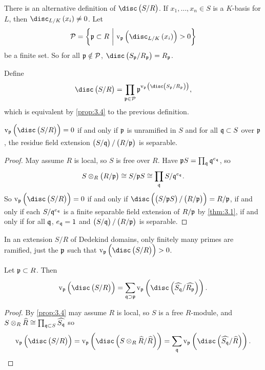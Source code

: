 There is an alternative definition of $ \disc\br{S / R} $. If $ x_1, \dots, x_n \in S $ is a $ K $-basis for $ L $, then $ \disc_{L / K} \br{x_i} \ne 0 $. Let
$$ \PPP = \cbr{\ppp \subset R \st \v_\ppp\br{\disc_{L / K} \br{x_i}} > 0} $$
be a finite set. So for all $ \mathfrak{p} \notin \mathcal{P} $, $ \disc\br{S_\ppp / R_\ppp} = R_\ppp $.

\begin{definition*}
Define
$$ \disc\br{S / R} = \prod_{\ppp \in \PPP} \ppp^{\v_\ppp\br{\disc\br{S_\ppp / R_\ppp}}}, $$
which is equivalent by \ref{prop:3.4} to the previous definition.
\end{definition*}

\begin{theorem}
\label{thm:3.5}
$ \v_\ppp\br{\disc\br{S / R}} = 0 $ if and only if $ \mathfrak{p} $ is unramified in $ S $ and for all $ \mathfrak{q} \subset S $ over $ \mathfrak{p} $, the residue field extension $ \br{S / \qqq} / \br{R / \ppp} $ is separable.
\end{theorem}

\begin{proof}
May assume $ R $ is local, so $ S $ is free over $ R $. Have $ \mathfrak{p} S = \prod_{\mathfrak{q}} \mathfrak{q}^{e_{\mathfrak{q}}} $, so
$$ S \otimes_R \br{R / \ppp} \cong S / \ppp S \cong \prod_\qqq S / \qqq^{e_\qqq}. $$
So $ \v_\ppp\br{\disc\br{S / R}} = 0 $ if and only if $ \disc\br{\br{S / \ppp S} / \br{R / \ppp}} = R / \ppp $, if and only if each $ S / \mathfrak{q}^{e_{\mathfrak{q}}} $ is a finite separable field extension of $ R / \mathfrak{p} $ by \ref{thm:3.1}, if and only if for all $ \mathfrak{q} $, $ e_{\mathfrak{q}} = 1 $ and $ \br{S / \qqq} / \br{R / \ppp} $ is separable.
\end{proof}

\begin{corollary}
In an extension $ S / R $ of Dedekind domains, only finitely many primes are ramified, just the $ \mathfrak{p} $ such that $ \v_\ppp\br{\disc\br{S / R}} > 0 $.
\end{corollary}

\begin{proposition}
Let $ \mathfrak{p} \subset R $. Then
$$ \v_\ppp\br{\disc\br{S / R}} = \sum_{\qqq \supset \ppp} \v_\ppp\br{\disc\br{\widehat{S_\qqq} / \widehat{R_\ppp}}}. $$
\end{proposition}

\begin{proof}
By \ref{prop:3.4} may assume $ R $ is local, so $ S $ is a free $ R $-module, and $ S \otimes_R \widehat{R} \cong \prod_{\mathfrak{q} \subset S} \widehat{S_{\mathfrak{q}}} $ so
$$ \v_\ppp\br{\disc\br{S / R}} = \v_\ppp\br{\disc\br{S \otimes_R \widehat{R} / \widehat{R}}} = \sum_\qqq \v_\ppp\br{\disc\br{\widehat{S_\qqq} / \widehat{R}}}. $$
\end{proof}

